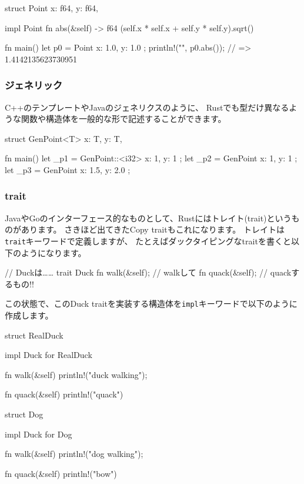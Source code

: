 \documentclass[mingoth,a4paper]{jsarticle}
\begin{document}
\begin{commandline}
struct Point {
    x: f64,
    y: f64,
}

impl Point {
    fn abs(&self) -> f64 {
        (self.x * self.x + self.y * self.y).sqrt()
    }
}

fn main() {
    let p0 = Point { x: 1.0, y: 1.0 };
    println!("{}", p0.abs()); // => 1.4142135623730951
}
\end{commandline}

\subsubsection{ジェネリック}

C++のテンプレートやJavaのジェネリクスのように、
Rustでも型だけ異なるような関数や構造体を一般的な形で記述することができます。

\begin{commandline}
struct GenPoint<T> {
    x: T,
    y: T,
}

fn main() {
    let _p1 = GenPoint::<i32> { x: 1, y: 1 };
    let _p2 = GenPoint { x: 1, y: 1 };
    let _p3 = GenPoint { x: 1.5, y: 2.0 };
}
\end{commandline}

\subsubsection{trait}

JavaやGoのインターフェース的なものとして、Rustにはトレイト(trait)というものがあります。
さきほど出てきたCopy traitもこれになります。
トレイトは\texttt{trait}キーワードで定義しますが、
たとえばダックタイピングなtraitを書くと以下のようになります。

\begin{commandline}
// Duckは……
trait Duck {
    fn walk(&self);   // walkして
    fn quack(&self);  // quackするもの!!
}
\end{commandline}

この状態で、このDuck traitを実装する構造体を\texttt{impl}キーワードで以下のように作成します。

\begin{commandline}
struct RealDuck {}

impl Duck for RealDuck {
    fn walk(&self) {
        println!("duck walking");
    }

    fn quack(&self) {
        println!("quack")
    }
}

struct Dog {}

impl Duck for Dog {
    fn walk(&self) {
        println!("dog walking");
    }

    fn quack(&self) {
        println!("bow")
    }
}
\end{commandline}
\end{document}
